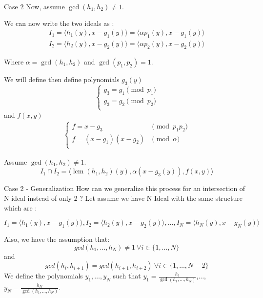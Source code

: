 \documentclass{beamer}
\DeclareMathOperator{\lcm}{lcm}
\begin{document}
\begin{frame}{Case 2}
    Now, assume $\gcd(h_{1}, {h_2}) \neq 1$.

We can now write the two ideals as :
\begin{align*}
    I_{1} = \langle h_{1}(y), x - g_{1}(y) \rangle = \langle \alpha p_{1}(y), x - g_{1}(y) \rangle \\
    I_{2} = \langle h_{2}(y), x - g_{2}(y) \rangle = \langle \alpha p_{2}(y), x - g_{2}(y) \rangle
\end{align*}

Where $\alpha = \gcd(h_{1}, h_{2})$ and $\gcd(p_{1}, p_{2}) = 1$.

We will define then define polynomials $g_{3}(y)$
\begin{displaymath}
    \left\{
    \begin{array}{ll}
        g_{3} = g_{1} \pmod {p_{1}} \\
        g_{3} = g_{2} \pmod {p_{2}} \\
    \end{array}
    \right.
\end{displaymath}
and $f(x, y)$
\begin{align*}
    \left\{
    \begin{array}{ll}
        f = x - g_{3}           & \pmod {p_{1}p_{2}}         \\
        f = (x-g_{1})(x-g_{2})  & \pmod {\alpha}             \\
    \end{array}
    \right.
\end{align*}

\begin{theorem} \label{th:inter-2-gcd-neq-1}
    Assume $\gcd(h_{1}, h_{2}) \neq 1$.
    \begin{displaymath}
        I_{1} \cap I_{2} = \langle \lcm(h_{1}, h_{2})(y), \alpha (x - g_{3}(y)), f(x,y) \rangle
    \end{displaymath}
\end{theorem}
\end{frame}

\begin{frame}{Case 2 - Generalization}
How can we generalize this process for an intersection of N ideal instead of only 2 ?
Let assume we have N Ideal with the same structure which are :

$I_{1} = \langle h_{1}(y),x-g_{1}(y) \rangle, I_{2} = \langle h_{2}(y),x-g_{2}(y) \rangle, \dots ,I_{N} = \langle h_{N}(y),x-g_{N}(y) \rangle$


Also, we have the assumption that: \[gcd(h_{1},\dots,h_{N})\neq1\ \forall i \in \{1,\dots,N\}\]
and \[gcd(h_{i},h_{i+1})=gcd(h_{i+1},h_{i+2})\ \forall i \in \{1,\dots,N-2\}\]
 We define the polynomials $y_{1},\dots,y_{N}$ such that $y_{1} = \displaystyle \frac{h_{1}}{\gcd(h_{1},\dots,h_{N})}$,$\dots$, $y_{N} = \displaystyle \frac{h_{N}}{\gcd(h_{1},\dots,h_{N})}$.

\end{frame}
\end{document}
